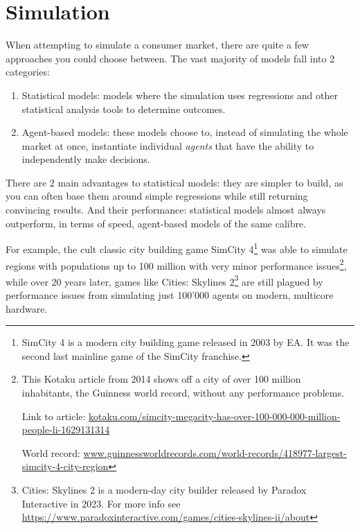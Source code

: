 \section{Simulation}
\label{sec:sim}

When attempting to simulate a consumer market, there are quite a few approaches
you could choose between. The vast majority of models fall into 2 categories:

\begin{enumerate}
	\item{Statistical models: models where the simulation uses regressions and
	      other statistical analysis tools to determine outcomes.}
	\item{Agent-based models: these models choose to, instead of simulating the
	      whole market at once, instantiate individual \textit{agents} that have
	      the ability to independently make decisions.  }
\end{enumerate}

There are 2 main advantages to statistical models: they are simpler to build, as
you can often base them around simple regressions while still returning convincing
results. And their performance: statistical models almost always outperform, in terms
of speed, agent-based models of the same calibre.

For example, the cult classic city building game SimCity 4\footnote{SimCity 4 is a modern city building game released in 2003 by EA.
	It was the second last mainline game of the SimCity franchise.} was able to simulate regions
with populations up to 100 million with very minor performance issues\footnote{
	This Kotaku article from 2014 shows off a city of over 100 million
	inhabitants, the Guinness world record, without any performance problems.

	\noindent  Link to article:
	\href{https://kotaku.com/simcity-megacity-has-over-100-000-000-million-people-li-1629131314}
	{kotaku.com/simcity-megacity-has-over-100-000-000-million-people-li-1629131314}

	\noindent World record:
	\href{https://www.guinnessworldrecords.com/world-records/418977-largest-simcity-4-city-region}
	{www.guinnessworldrecords.com/world-records/418977-largest-simcity-4-city-region}
}, while over 20 years later, games like Cities: Skylines 2\footnote{Cities: Skylines 2
	is a modern-day city builder released by Paradox Interactive in 2023. For more info see
	\href{https://www.paradoxinteractive.com/games/cities-skylines-ii/about}{https://www.paradoxinteractive.com/games/cities-skylines-ii/about}}
are still plagued by performance issues from simulating just 100'000 agents on modern, multicore
hardware.

